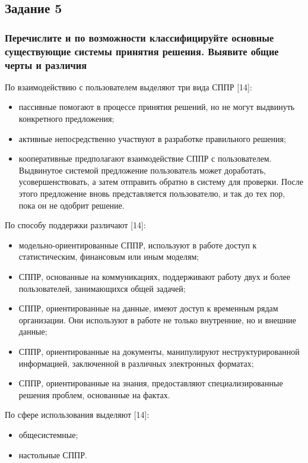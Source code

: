 \documentclass[14pt,a4paper,report]{report}
\begin{document}
\subsection{Задание 5}

\subsubsection{Перечислите и по возможности классифицируйте основные существующие системы принятия решения. Выявите общие черты и различия}

По взаимодействию с пользователем выделяют три вида СППР [14]:

\begin{itemize}
	\item пассивные помогают в процессе принятия решений, но не могут выдвинуть конкретного предложения;
	\item активные непосредственно участвуют в разработке правильного решения;
	\item кооперативные предполагают взаимодействие СППР с пользователем. Выдвинутое системой предложение пользователь может доработать, усовершенствовать, а затем отправить обратно в систему для проверки. После этого предложение вновь представляется пользователю, и так до тех пор, пока он не одобрит решение.
\end{itemize}

По способу поддержки различают [14]:

\begin{itemize}
	\item модельно-ориентированные СППР, используют в работе доступ к статистическим, финансовым или иным моделям;
	\item СППР, основанные на коммуникациях, поддерживают работу двух и более пользователей, занимающихся общей задачей;
	\item СППР, ориентированные на данные, имеют доступ к временным рядам организации. Они используют в работе не только внутренние, но и внешние данные;
	\item СППР, ориентированные на документы, манипулируют неструктурированной информацией, заключенной в различных электронных форматах;
	\item СППР, ориентированные на знания, предоставляют специализированные решения проблем, основанные на фактах.
\end{itemize}	
	
По сфере использования выделяют [14]:

\begin{itemize}
	\item общесистемные;
	\item настольные СППР.
\end{itemize}
\end{document}
